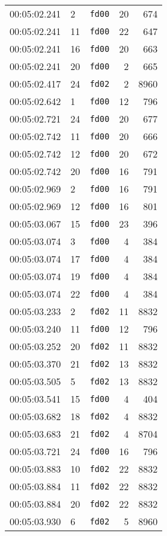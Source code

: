 \documentclass{article}
\begin{document}
\begin{longtable}{lllrr}
00:05:02.241 & 2 & \texttt{fd00} & 20 & 674 \\
00:05:02.241 & 11 & \texttt{fd00} & 22 & 647 \\
00:05:02.241 & 16 & \texttt{fd00} & 20 & 663 \\
00:05:02.241 & 20 & \texttt{fd00} & 2 & 665 \\
00:05:02.417 & 24 & \texttt{fd02} & 2 & 8960 \\
00:05:02.642 & 1 & \texttt{fd00} & 12 & 796 \\
00:05:02.721 & 24 & \texttt{fd00} & 20 & 677 \\
00:05:02.742 & 11 & \texttt{fd00} & 20 & 666 \\
00:05:02.742 & 12 & \texttt{fd00} & 20 & 672 \\
00:05:02.742 & 20 & \texttt{fd00} & 16 & 791 \\
00:05:02.969 & 2 & \texttt{fd00} & 16 & 791 \\
00:05:02.969 & 12 & \texttt{fd00} & 16 & 801 \\
00:05:03.067 & 15 & \texttt{fd00} & 23 & 396 \\
00:05:03.074 & 3 & \texttt{fd00} & 4 & 384 \\
00:05:03.074 & 17 & \texttt{fd00} & 4 & 384 \\
00:05:03.074 & 19 & \texttt{fd00} & 4 & 384 \\
00:05:03.074 & 22 & \texttt{fd00} & 4 & 384 \\
00:05:03.233 & 2 & \texttt{fd02} & 11 & 8832 \\
00:05:03.240 & 11 & \texttt{fd00} & 12 & 796 \\
00:05:03.252 & 20 & \texttt{fd02} & 11 & 8832 \\
00:05:03.370 & 21 & \texttt{fd02} & 13 & 8832 \\
00:05:03.505 & 5 & \texttt{fd02} & 13 & 8832 \\
00:05:03.541 & 15 & \texttt{fd00} & 4 & 404 \\
00:05:03.682 & 18 & \texttt{fd02} & 4 & 8832 \\
00:05:03.683 & 21 & \texttt{fd02} & 4 & 8704 \\
00:05:03.721 & 24 & \texttt{fd00} & 16 & 796 \\
00:05:03.883 & 10 & \texttt{fd02} & 22 & 8832 \\
00:05:03.884 & 11 & \texttt{fd02} & 22 & 8832 \\
00:05:03.884 & 20 & \texttt{fd02} & 22 & 8832 \\
00:05:03.930 & 6 & \texttt{fd02} & 5 & 8960 \\

\end{longtable}
\end{document}
